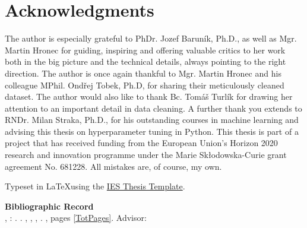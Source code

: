 \section*{Acknowledgments}
The author is especially grateful to PhDr. Jozef Barun\'{i}k, Ph.D., as well as Mgr. Martin Hronec for guiding, inspiring and offering valuable critics to her work both in the big picture and the technical details, always pointing to the right direction. The author is once again thankful to Mgr. Martin Hronec and his colleague MPhil. Ond\v{r}ej Tobek, Ph.D, for sharing their meticulously cleaned dataset. The author would also like to thank Bc. Tom\'{a}\v{s} Turl\'{i}k for drawing her attention to an important detail in data cleaning. A further thank you extends to RNDr. Milan Straka, Ph.D., for his outstanding courses in machine learning and advising this thesis on hyperparameter tuning in Python. This thesis is part of a project that has received funding from the European Union’s Horizon 2020 research and innovation programme under the Marie Skłodowska-Curie grant agreement No. 681228. All mistakes are, of course, my own. 


\vfill

\noindent Typeset in \LaTeX  using the \href{https://is.cuni.cz/studium/eng/predmety/index.php?do=predmet&kod=JEM001}{IES Thesis Template}. 

\bigskip

\noindent \textbf{Bibliographic Record} \\
\LastNameDP, \FirstNameDP: \emph{\Bookname}. \BookName. \CUNI, \FSS, \IES, \Place. \Year, pages \ref*{TotPages}. Advisor: \Supervisor


